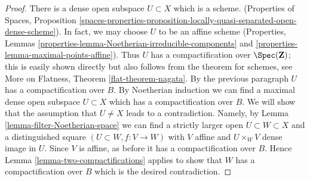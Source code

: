 \begin{proof}
\medskip\noindent
There is a dense open subspace $U \subset X$ which is a scheme.
(Properties of Spaces, Proposition
\ref{spaces-properties-proposition-locally-quasi-separated-open-dense-scheme}).
In fact, we may choose $U$ to be an affine scheme
(Properties, Lemmas \ref{properties-lemma-Noetherian-irreducible-components}
and \ref{properties-lemma-maximal-points-affine}).
Thus $U$ has a compactification over $\Spec(\mathbf{Z})$;
this is easily shown directly but also follows from the
theorem for schemes, see
More on Flatness, Theorem \ref{flat-theorem-nagata}.
By the previous paragraph $U$ has a compactification over $B$. 
By Noetherian induction we can find a maximal dense open subspace
$U \subset X$ which has a compactification over $B$. We will show
that the assumption that $U \not = X$ leads to a contradiction.
Namely, by Lemma \ref{lemma-filter-Noetherian-space}
we can find a strictly larger open $U \subset W \subset X$
and a distinguished square $(U \subset W, f : V \to W)$
with $V$ affine and $U \times_W V$ dense image in $U$.
Since $V$ is affine, as before it has a compactification over $B$. Hence
Lemma \ref{lemma-two-compactifications}
applies to show that $W$ has a compactification over $B$
which is the desired contradiction.
\end{proof}












